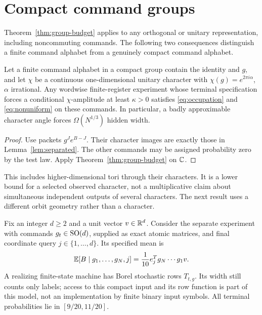 \section{Compact command groups}\label{sec:compact}
Theorem~\ref{thm:group-budget} applies to any orthogonal or unitary
representation, including noncommuting commands. The following two
consequences distinguish a finite command alphabet from a genuinely
compact command alphabet.

\begin{corollary}\label{cor:characters}
Let a finite command alphabet in a compact group contain the identity
and $g$, and let $\chi$ be a continuous one-dimensional unitary character
with $\chi(g)=e^{2\pi i\alpha}$, $\alpha$ irrational. Any wordwise
finite-register experiment whose terminal specification forces a
conditional $\chi$-amplitude at least $\kappa>0$ satisfies
\eqref{eq:occupation} and \eqref{eq:nonuniform} on these commands.
In particular, a badly approximable character angle forces
$\Omega(N^{1/3})$ hidden width.
\end{corollary}
\begin{proof}
Use packets $g^J e^{B-J}$. Their character images are exactly those in
Lemma~\ref{lem:separated}. The other commands may be assigned probability
zero by the test law. Apply Theorem~\ref{thm:group-budget} on $\mathbb C$.
\end{proof}
This includes higher-dimensional tori through their characters. It is a
lower bound for a selected observed character, not a multiplicative
claim about simultaneous independent outputs of several characters.
The next result uses a different orbit geometry rather than a character.

Fix an integer $d\ge2$ and a unit vector $v\in\mathbb R^d$. Consider the
separate experiment with commands $g_t\in\operatorname{SO}(d)$, supplied as exact
atomic matrices, and final coordinate query $j\in\{1,\ldots,d\}$.
Its specified mean is
\begin{equation}\label{eq:sphere-target}
          \mathbb E[B\mid g_1,\ldots,g_N,j]
             =\frac1{10}e_j^Tg_N\cdots g_1v.
\end{equation}
A realizing finite-state machine has Borel stochastic rows $T_{t,g}$.
Its width still counts only labels; access to this compact input and its
row function is part of this model, not an implementation by finite
binary input symbols. All terminal probabilities lie in $[9/20,11/20]$.

